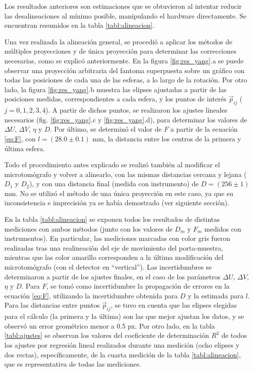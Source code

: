 Los resultados anteriores son estimaciones que se obtuvieron al intentar reducir las desalineaciones
al mínimo posible, manipulando el hardware directamente. Se encuentran resumidos en la tabla
\ref{tabl:alineacion}.

Una vez realizada la alineación general, se procedió a aplicar los métodos de múltiples proyecciones
y de única proyección para
determinar las correcciones necesarias, como se explicó anteriormente. En la figura
\ref{fig:res_yang}.a se puede observar una proyección arbitraria del fantoma superpuesta
sobre un gráfico con todas las posiciones de cada una
de las esferas, a lo largo de la rotación. Por otro lado, la figura \ref{fig:res_yang}.b
muestra las elipses ajustadas a partir de las posiciones medidas, correspondientes a cada esfera,
y los puntos de interés $\vec{p}_{ij}$ ($j=0,1,2,3,4$). A partir de dichos puntos, se
realizaron los ajustes lineales necesarios (fig. \ref{fig:res_yang}.c y \ref{fig:res_yang}.d), para determinar
los valores de $\Delta U$, $\Delta V$, $\eta$ y $D$. Por último, se determinó el valor de $F$ a partir de la ecuación \ref{eq:F}, con
$l=(28.0 \pm 0.1)$ mm, la distancia entre los centros de la primera y última esfera. 

Todo el procedimiento antes explicado se realizó también al modificar el microtomógrafo y volver
a alinearlo, con las mismas distancias cercana y lejana ($D_1$ y $D_2$), y con una distancia
final (medida con instrumento) de $D = (256 \pm 1)$ mm. No se utilizó el método de una única
proyección en este caso, ya que su inconsistencia e imprecisión ya se había demostrado (ver siguiente
sección).

En la tabla \ref{tabl:alineacion}
se exponen todos los resultados de distintas mediciones con ambos métodos (junto con los valores
de $D_m$ y $F_m$ medidos con instrumentos). En particular, las mediciones marcadas con color gris
fueron realizadas tras una realineación del eje de movimiento del porta-muestra, mientras que las
color amarillo corresponden a la última modificación del microtomógrafo (con el detector en ``vertical'').
Las incertidumbres se determinaron a partir de
los ajustes finales, en el caso de los parámetros $\Delta U$, $\Delta V$, $\eta$ y $D$. Para $F$,
se tomó como incertidumbre la propagación de errores en la ecuación \ref{eq:F}, utilizando la incertidumbre
obtenida para $D$ y la estimada para $l$. Para las distancias entre puntos $\vec{p}_{ij}$, se tuvo en cuenta
que las elipses elegidas para el cálculo (la primera y la última) son las que mejor ajustan los datos,
y se observó un error geométrico menor a 0.5 px. Por otro lado,
en la tabla \ref{tabl:ajustes} se observan los valores del coeficiente de determinación $R^2$ de
todos los ajustes por regresión lineal realizados durante una medición (ocho elipses y dos rectas),
específicamente, de la cuarta medición de la tabla \ref{tabl:alineacion}, que es representativa
de todas las mediciones.


